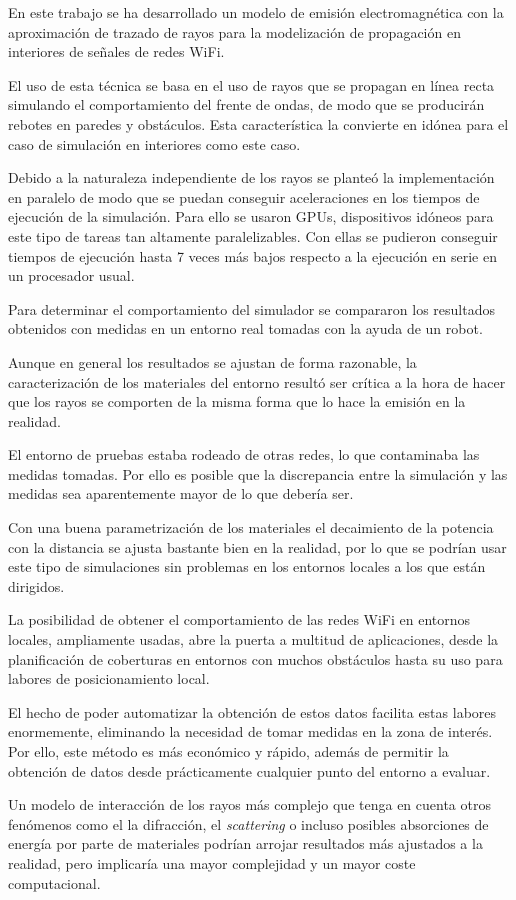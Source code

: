 En este trabajo se ha desarrollado un modelo de emisión electromagnética con la aproximación de trazado de rayos para la modelización de propagación en interiores de señales de redes WiFi.

El uso de esta técnica se basa en el uso de rayos que se propagan en línea recta simulando el comportamiento del frente de ondas, de modo que se producirán rebotes en paredes y obstáculos.
Esta característica la convierte en idónea para el caso de simulación en interiores como este caso.

Debido a la naturaleza independiente de los rayos se planteó la implementación en paralelo de modo que se puedan conseguir aceleraciones en los tiempos de ejecución de la simulación.
Para ello se usaron GPUs, dispositivos idóneos para este tipo de tareas tan altamente paralelizables.
Con ellas se pudieron conseguir tiempos de ejecución hasta 7 veces más bajos respecto a la ejecución en serie en un procesador usual.

Para determinar el comportamiento del simulador se compararon los resultados obtenidos con medidas en un entorno real tomadas con la ayuda de un robot.

Aunque en general los resultados se ajustan de forma razonable, la caracterización de los materiales del entorno resultó ser crítica a la hora de hacer que los rayos se comporten de la misma forma que lo hace la emisión en la realidad.

El entorno de pruebas estaba rodeado de otras redes, lo que contaminaba las medidas tomadas.
Por ello es posible que la discrepancia entre la simulación y las medidas sea aparentemente mayor de lo que debería ser.

Con una buena parametrización de los materiales el decaimiento de la potencia con la distancia se ajusta bastante bien en la realidad, por lo que se podrían usar este tipo de simulaciones sin problemas en los entornos locales a los que están dirigidos.

La posibilidad de obtener el comportamiento de las redes WiFi en entornos locales, ampliamente usadas, abre la puerta a multitud de aplicaciones, desde la planificación de coberturas en entornos con muchos obstáculos hasta su uso para labores de posicionamiento local.

El hecho de poder automatizar la obtención de estos datos facilita estas labores enormemente, eliminando la necesidad de tomar medidas en la zona de interés.
Por ello, este método es más económico y rápido, además de permitir la obtención de datos desde prácticamente cualquier punto del entorno a evaluar.

Un modelo de interacción de los rayos más complejo que tenga en cuenta otros fenómenos como el la difracción, el \textit{scattering} o incluso posibles absorciones de energía por parte de materiales podrían arrojar resultados más ajustados a la realidad, pero implicaría una mayor complejidad y un mayor coste computacional.